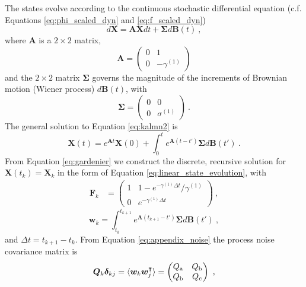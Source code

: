 \documentclass[fleqn,usenatbib,useAMS]{mnras}
\begin{document}
The states evolve according to the continuous stochastic differential equation (c.f. Equations \eqref{eq:phi_scaled_dyn} and \eqref{eq:f_scaled_dyn})
\begin{equation}
	d \boldsymbol{X} = \boldsymbol{A} \boldsymbol{X} dt + \boldsymbol{\Sigma} d \boldsymbol{B}(t) \ , \label{eq:kalmn2}
\end{equation}
where $\boldsymbol{A}$ is a $2 \times 2$ matrix,
\begin{equation}
	\boldsymbol{A} = \begin{pmatrix}
		0      & 1  \\
		0       & -\gamma^{(1)}  
	\end{pmatrix}
\end{equation}
and the $2\times 2$ matrix $\boldsymbol{\Sigma}$ governs the magnitude of the increments of Brownian motion (Wiener process) $d\boldsymbol{B}(t)$, with
\begin{equation}
	\boldsymbol{\Sigma} = \begin{pmatrix}
		0      & 0  \\
		0       & \sigma^{(1)}
		\end{pmatrix} \ .
\end{equation}
The general solution to Equation \eqref{eq:kalmn2} is \citep{gardiner2009stochastic}
\begin{equation}
	\boldsymbol{X}(t) = e^{\boldsymbol{A} t} \boldsymbol{X}(0) + \int_0^t e^{\boldsymbol{A}(t-t')} \boldsymbol{\Sigma} d\boldsymbol{B}(t') \ . \label{eq:gardenier}
\end{equation} 
From Equation \eqref{eq:gardenier} we construct the discrete, recursive solution for $\boldsymbol{X}(t_k) = \boldsymbol{X}_k$ in the form of Equation \eqref{eq:linear_state_evolution}, with
\begin{align}
	\boldsymbol{F}_k &= \begin{pmatrix}
		1      & 1-e^{-\gamma^{(1)}\Delta t}/\gamma^{(1)}  \\
		0       & e^{-\gamma^{(1)}\Delta t}
	\end{pmatrix} \ ,
\end{align}
\begin{equation}
	\boldsymbol{w}_k = \int_{t_k}^{t_{k+1}} e^{\boldsymbol{A}\left( t_{k+1} - t' \right)} \boldsymbol{\Sigma} d \boldsymbol{B}(t') \ ,  \label{eq:appendix_noise}
\end{equation}
and $\Delta t = t_{k+1} - t_k$. From Equation \eqref{eq:appendix_noise} the process noise covariance matrix is
\begin{equation}
	\boldsymbol{Q}_k \boldsymbol{\delta}_{kj}= \langle \boldsymbol{w}_k \boldsymbol{w}_j^\intercal \rangle = \begin{pmatrix}
		Q_{\rm a}      & Q_{\rm b}  \\
		Q_{\rm b}       & Q_{\rm c}
	\end{pmatrix} \ ,
\end{equation}
\end{document}
